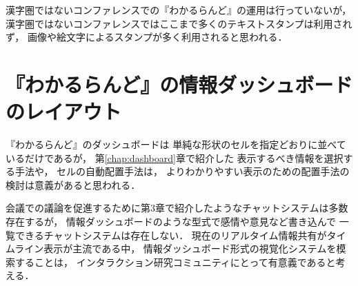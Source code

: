 漢字圏ではないコンファレンスでの『わかるらんど』の運用は行っていないが，
漢字圏ではないコンファレンスではここまで多くのテキストスタンプは利用されず，
画像や絵文字によるスタンプが多く利用されると思われる．


\section{『わかるらんど』の情報ダッシュボードのレイアウト}

『わかるらんど』のダッシュボードは
単純な形状のセルを指定どおりに並べているだけであるが，
第\ref{chap:dashboard}章で紹介した
表示するべき情報を選択する手法\cite{Jones:2015:ECI:2800835.2800963}や，
セルの自動配置手法\cite{Hertzog:2015:BSP:2678025.2701383}は，
よりわかりやすい表示のための配置手法の検討は意義があると思われる．

会議での議論を促進するために第3章で紹介したようなチャットシステムは多数存在するが，
情報ダッシュボードのような型式で感情や意見など書き込んで
一覧できるチャットシステムは存在しない．
現在のリアルタイム情報共有がタイムライン表示が主流である中，
情報ダッシュボード形式の視覚化システムを模索することは，
インタラクション研究コミュニティにとって有意義であると考える．